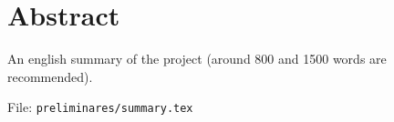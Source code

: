 %


\chapter{Abstract}


An english summary of the project (around 800 and 1500 words are recommended).

File: \texttt{preliminares/summary.tex}


\endinput

